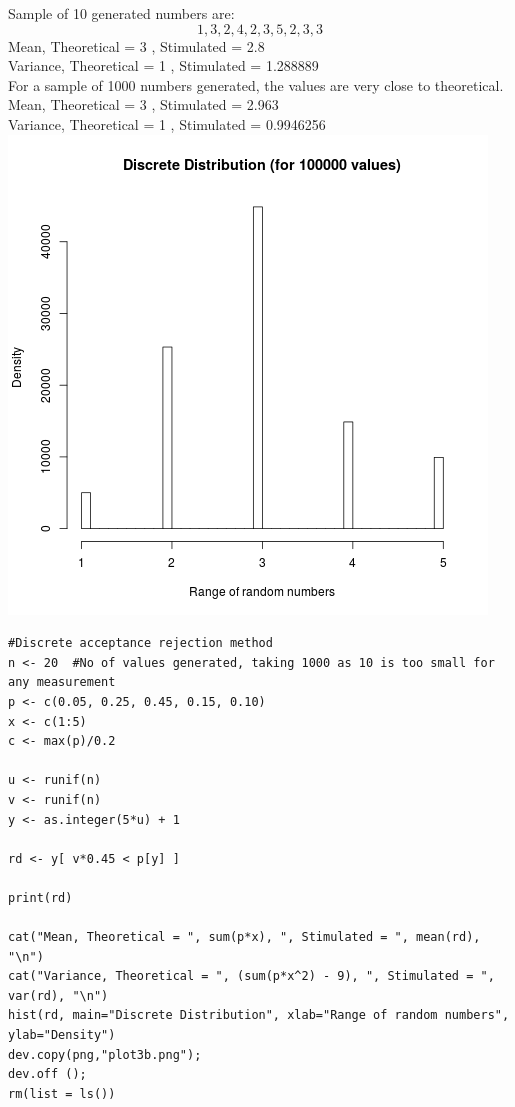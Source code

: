\documentclass{article}
\begin{document}
Sample of 10 generated numbers are:
$$1, 3, 2, 4, 2, 3, 5, 2, 3, 3$$
Mean, Theoretical =  3 , Stimulated =  2.8 \\
Variance, Theoretical =  1 , Stimulated =  1.288889 \\

For a sample of 1000 numbers generated, the values are very close to theoretical.\\
Mean, Theoretical =  3 , Stimulated =  2.963 \\
Variance, Theoretical =  1 , Stimulated =  0.9946256 \\

\includegraphics{"plot3a"}


\begin{lstlisting}
#Discrete acceptance rejection method
n <- 20	 #No of values generated, taking 1000 as 10 is too small for any measurement
p <- c(0.05, 0.25, 0.45, 0.15, 0.10)
x <- c(1:5)
c <- max(p)/0.2

u <- runif(n)
v <- runif(n)
y <- as.integer(5*u) + 1

rd <- y[ v*0.45 < p[y] ]

print(rd)

cat("Mean, Theoretical = ", sum(p*x), ", Stimulated = ", mean(rd), "\n")
cat("Variance, Theoretical = ", (sum(p*x^2) - 9), ", Stimulated = ", var(rd), "\n")
hist(rd, main="Discrete Distribution", xlab="Range of random numbers", ylab="Density")
dev.copy(png,"plot3b.png");
dev.off ();
rm(list = ls())
\end{lstlisting}
\end{document}
